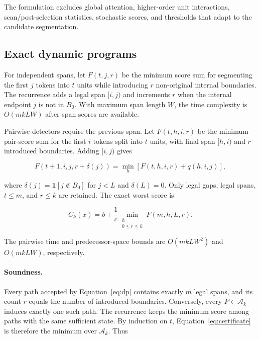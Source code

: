 \documentclass[10pt]{article}
\begin{document}
The formulation excludes global attention, higher-order unit interactions,
scan/post-selection statistics, stochastic scores, and thresholds that adapt
to the candidate segmentation.

\subsection{Exact dynamic programs}

For independent spans, let $F(t,j,r)$ be the minimum score sum for segmenting
the first $j$ tokens into $t$ units while introducing $r$ non-original
internal boundaries. The recurrence adds a legal span $[i,j)$ and increments
$r$ when the internal endpoint $j$ is not in $B_0$. With maximum span length
$W$, the time complexity is $O(mkLW)$ after span scores are available.

Pairwise detectors require the previous span. Let
$F(t,h,i,r)$ be the minimum pair-score sum for the first $i$ tokens split
into $t$ units, with final span $[h,i)$ and $r$ introduced boundaries.
Adding $[i,j)$ gives

\begin{equation}
F(t+1,i,j,r+\delta(j))
=
\min_h\left[F(t,h,i,r)+q(h,i,j)\right],
\label{eq:dp}
\end{equation}

where $\delta(j)=\mathbf 1[j\notin B_0]$ for $j<L$ and $\delta(L)=0$.
Only legal gaps, legal spans, $t\leq m$, and $r\leq k$ are retained. The exact
worst score is

\begin{equation}
C_k(x)=b+\frac{1}{c}
\min_{\substack{h\\0\leq r\leq k}}F(m,h,L,r).
\label{eq:certificate}
\end{equation}

The pairwise time and predecessor-space bounds are $O(mkLW^2)$ and
$O(mkLW)$, respectively.

\paragraph{Soundness.}
Every path accepted by Equation~\ref{eq:dp} contains exactly $m$ legal spans,
and its count $r$ equals the number of introduced boundaries. Conversely,
every $P\in\mathcal A_k$ induces exactly one such path. The recurrence keeps
the minimum score among paths with the same sufficient state. By induction on
$t$, Equation~\ref{eq:certificate} is therefore the minimum over
$\mathcal A_k$. Thus
\end{document}
